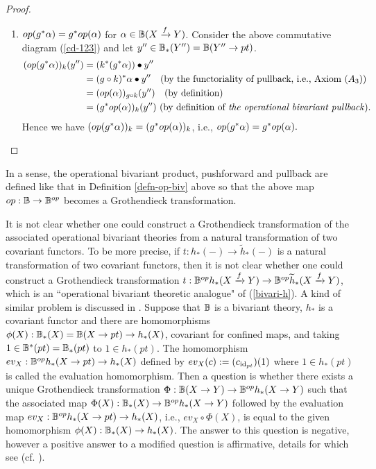 \documentclass[a4paper]{amsart}
\begin{document}
\begin{proof}
\begin{enumerate}
\begin{align*}
& =  ((f')_* \circ (op(\alp))_h )(z') \\
& = (f_*op(\alp))_h (z')  \,\, \text{(by definition of \emph{the operational bivariant pushforward} )}
\end{align*}.
Hence we have $(op(f_*\alp))_h = (f_*op(\alp))_h$, i.e., $op(f_*\alp)  = f_*op(\alp)$.
\item $op(g^*\alpha)=g^*op(\alpha)$ for $\alpha \in \mathbb B(X \xrightarrow f Y)$. Consider the above commutative diagram (\ref{cd-123}) and let $y'' \in \mathbb B_*(Y'')=\mathbb B(Y'' \to pt)$.
\begin{align*}
(op(g^*\alpha))_k(y'') & = (k^*(g^*\alpha))\bullet y'' \\
& = (g \circ k)^*\alpha \bullet y''  \quad \text{(by the functoriality of pullback, i.e., Axiom ($A_3$))}\\
& = (op(\alpha))_{g \circ k} (y'') \quad \text{(by definition)}\\
& = (g^*op(\alpha))_k (y'') \, \, \text{(by definition of \emph{the operational bivariant pullback}).}
\end{align*}
Hence we have $(op(g^*\alpha))_k = (g^*op(\alpha))_k$, i.e., $op(g^*\alpha) = g^*op(\alpha).$
\end{enumerate}
\end{proof}
\begin{rem}\label{3-rem-bb} In a sense, the operational bivariant product, pushforward and pullback are defined like that in Definition \ref{defn-op-biv} above so that the above map $ op:\mathbb B \to \mathbb B^{op}$ becomes a Grothendieck transformation.
\end{rem}

It is not clear whether one could construct a Grothendieck transformation of the associated operational bivariant theories from a natural transformation of two covariant functors. To be more precise, if $t :h_*(-) \to \widetilde h_*(-)$ is a natural transformation of two covariant functors, then it is not clear whether one could construct a Grothendieck transformation $t:\mathbb B^{op}h_*(X \xrightarrow f Y) \to \mathbb B^{op}\widetilde h_*(X \xrightarrow f Y)$, which is an ``operational bivariant theoretic analogue" of (\ref{bivari-h}). A kind of similar problem is discussed in \cite[\S 8.2]{FM}. Suppose that $\mathbb B$ is a bivariant theory, $h_*$ is a covariant functor and there are homomorphisms $\phi(X): \mathbb B_*(X)=\mathbb B(X \to pt) \to h_*(X)$, covariant for confined maps, and taking $1 \in \mathbb B^*(pt)=\mathbb B_*(pt)$ to $1 \in h_*(pt)$. 
The homomorphism $ev_X:\mathbb B^{op}h_*(X \to pt) \to h_*(X)$ defined by $ev_X(c) := (c_{\operatorname{id}_{pt}})(1)$ where $1 \in h_*(pt)$ is called the evaluation homomorphism. Then a question is whether there exists a unique Grothendieck transformation $\Phi:\mathbb B(X \to Y) \to \mathbb B^{op}h_*(X \to Y)$ such that the associated map $\Phi(X): \mathbb B_*(X) \to \mathbb B^{op}h_*(X \to Y)$ followed by the evaluation map $ev_X:\mathbb B^{op}h_*(X \to pt) \to h_*(X)$, i.e., $ev_X \circ \Phi(X)$, is equal to the given homomorphism $\phi(X):\mathbb B_*(X) \to h_*(X)$. The answer to this question is negative, however a positive answer to a modified question is affirmative, details for which see \cite{Yokura-ope} (cf. \cite{BSY-jpaa}). 
\end{document}
